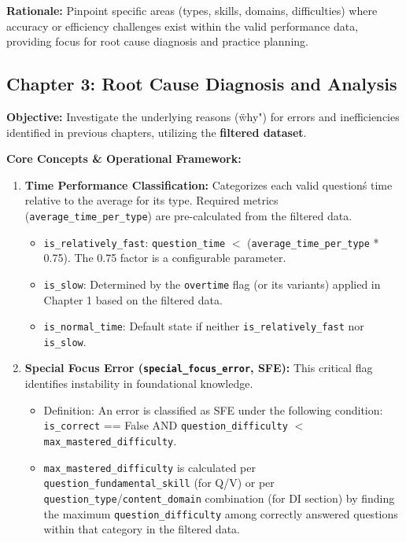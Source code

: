 \documentclass{article}
\begin{document}
\textbf{Rationale:} Pinpoint specific areas (types, skills, domains, difficulties) where accuracy or efficiency challenges exist within the valid performance data, providing focus for root cause diagnosis and practice planning.

\subsection{Chapter 3: Root Cause Diagnosis and Analysis}

\textbf{Objective:} Investigate the underlying reasons (\"why") for errors and inefficiencies identified in previous chapters, utilizing the \textbf{filtered dataset}.

\textbf{Core Concepts \& Operational Framework:}
\begin{enumerate}
    \item \textbf{Time Performance Classification:} Categorizes each valid question\'s time relative to the average for its type. Required metrics (\texttt{average\_time\_per\_type}) are pre-calculated from the filtered data.
    \begin{itemize}
        \item \texttt{is\_relatively\_fast}: \texttt{question\_time} $<$ (\texttt{average\_time\_per\_type} * 0.75). The 0.75 factor is a configurable parameter. %
        \item \texttt{is\_slow}: Determined by the \texttt{overtime} flag (or its variants) applied in Chapter 1 based on the filtered data.
        \item \texttt{is\_normal\_time}: Default state if neither \texttt{is\_relatively\_fast} nor \texttt{is\_slow}.
    \end{itemize}
    \item \textbf{Special Focus Error (\texttt{special\_focus\_error}, SFE):} This critical flag identifies instability in foundational knowledge.
    \begin{itemize}
        \item Definition: An error is classified as SFE under the following condition:
        \texttt{is\_correct} == False AND \texttt{question\_difficulty} $<$ \texttt{max\_mastered\_difficulty}. %
        \item \texttt{max\_mastered\_difficulty} is calculated per \texttt{question\_fundamental\_skill} (for Q/V) or per \texttt{question\_type}/\texttt{content\_domain} combination (for DI section) by finding the maximum \texttt{question\_difficulty} among correctly answered questions within that category in the filtered data.

\end{itemize}
\end{enumerate}
\end{document}
